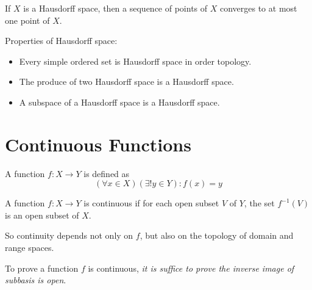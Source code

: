 \begin{theorem}
If $X$ is a Hausdorff space, then a sequence of points of $X$ converges to at most one point of $X$.    
\end{theorem}

\begin{theorem}
Properties of Hausdorff space:
\begin{itemize}
    \item Every simple ordered set is Hausdorff space in order topology.
    \item The produce of two Hausdorff space is a Hausdorff space.
    \item A subspace of a Hausdorff space is a Hausdorff space. 
\end{itemize}
\end{theorem}



\section{Continuous Functions}

\begin{definition}
    A function $f: X \rightarrow Y$ is defined as
    \begin{equation}
        (\forall x \in X) (\exists ! y \in Y): f(x) = y
    \end{equation}    
\end{definition}


\begin{definition}
    A function $f: X \rightarrow Y$ is continuous if for each open subset $V$ of $Y$, the set $f^{-1}(V)$ is an open subset of $X$.
    
    So continuity depends not only on $f$, but also on the topology of domain and range spaces.
\end{definition}

To prove a function $f$ is continuous, \emph{it is suffice to prove the inverse image of subbasis is open}.

